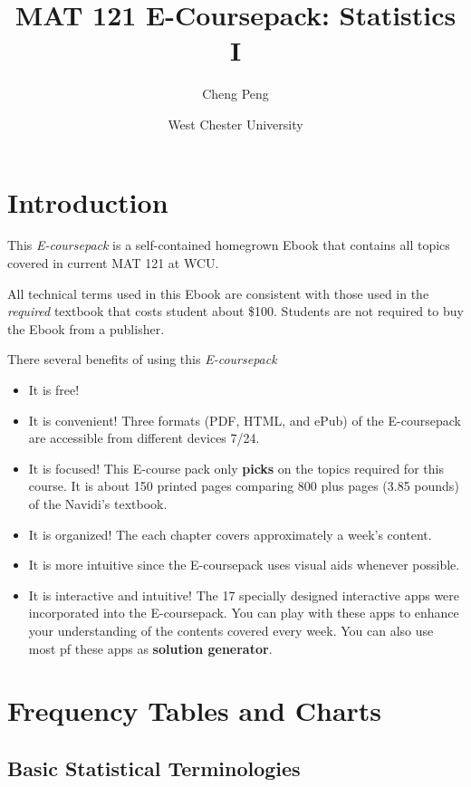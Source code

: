 \documentclass[
]{book}
\title{MAT 121 E-Coursepack: Statistics I}
\author{Cheng Peng}
\date{West Chester University}
\begin{document}
\maketitle

{
\setcounter{tocdepth}{1}
\tableofcontents
}
\hypertarget{introduction}{%
\chapter{Introduction}\label{introduction}}

This \emph{E-coursepack} is a self-contained homegrown Ebook that contains all topics covered in current MAT 121 at WCU.

All technical terms used in this Ebook are consistent with those used in the \emph{required} textbook that costs student about \$100. Students are not required to buy the Ebook from a publisher.

There several benefits of using this \emph{E-coursepack}

\begin{itemize}
\item
  It is free!
\item
  It is convenient! Three formats (PDF, HTML, and ePub) of the E-coursepack are accessible from different devices 7/24.
\item
  It is focused! This E-course pack only \textbf{picks} on the topics required for this course. It is about 150 printed pages comparing 800 plus pages (3.85 pounds) of the Navidi's textbook.
\item
  It is organized! The each chapter covers approximately a week's content.
\item
  It is more intuitive since the E-coursepack uses visual aids whenever possible.
\item
  It is interactive and intuitive! The 17 specially designed interactive apps were incorporated into the E-coursepack. You can play with these apps to enhance your understanding of the contents covered every week. You can also use most pf these apps as \textbf{solution generator}.
\end{itemize}

\hypertarget{frequency-tables-and-charts}{%
\chapter{Frequency Tables and Charts}\label{frequency-tables-and-charts}}

\hypertarget{basic-statistical-terminologies}{%
\section{Basic Statistical Terminologies}\label{basic-statistical-terminologies}}
\end{document}
